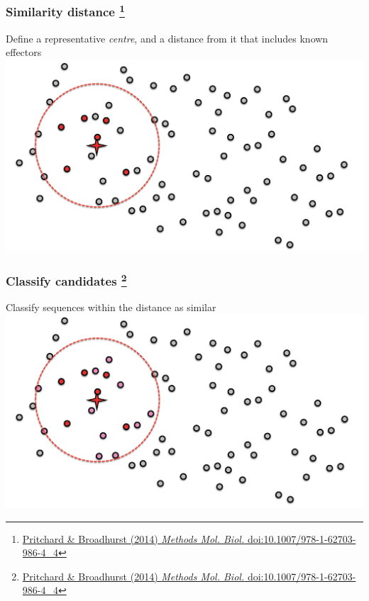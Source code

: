 \begin{frame}
  \frametitle{Similarity distance
  \footnote{\tiny{\href{http://dx.doi.org/10.1007/978-1-62703-986-4_4}{Pritchard \& Broadhurst (2014) \textit{Methods Mol. Biol.} doi:10.1007/978-1-62703-986-4\_4}}}
}
  Define a representative \textcolor{hutton_green}{\textit{centre}}, and a \textcolor{hutton_blue}{distance} from it that includes known effectors \vspace{0.5cm}
  \includegraphics[width=1\textwidth,valign=b]{images/finding_effectors2}    
\end{frame}

\begin{frame}
  \frametitle{Classify candidates
  \footnote{\tiny{\href{http://dx.doi.org/10.1007/978-1-62703-986-4_4}{Pritchard \& Broadhurst (2014) \textit{Methods Mol. Biol.} doi:10.1007/978-1-62703-986-4\_4}}}
}
  Classify sequences \textcolor{hutton_green}{within the distance} as \textcolor{hutton_blue}{similar} \vspace{0.5cm}
  \includegraphics[width=1\textwidth,valign=b]{images/finding_effectors3}    
\end{frame}

